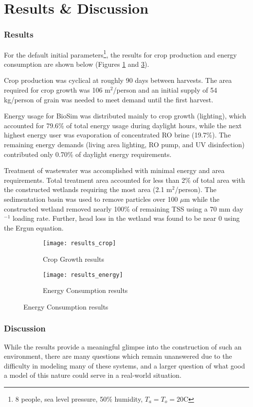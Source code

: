 \part{Results \& Discussion}
\section{Results}
For the default initial parameters\footnote{8 people, sea level pressure, 50\% humidity, $T_a=T_o=20$\degree C}, the results for crop production and energy consumption are shown below (Figures \ref{fig:results_crop} and \ref{fig:results_energy}). 

Crop production was cyclical at roughly 90 days between harvests. The area required for crop growth was 106 m$^2$/person and an initial supply of 54 kg/person of grain was needed to meet demand until the first harvest.

Energy usage for BioSim was distributed mainly to crop growth (lighting), which accounted for 79.6\% of total energy usage during daylight hours, while the next highest energy user was evaporation of concentrated RO brine (19.7\%). The remaining energy demands (living area lighting, RO pump, and UV disinfection) contributed only 0.70\% of daylight energy requirements.

Treatment of wastewater was accomplished with minimal energy and area requirements. Total treatment area accounted for less than 2\% of total area with the constructed wetlands requiring the most area (2.1 m$^2$/person). The sedimentation basin was used to remove particles over 100 $\mu$m while the constructed wetland removed nearly 100\% of remaining TSS using a 70 mm day$^{-1}$ loading rate. Further, head loss in the wetland was found to be near 0 using the Ergun equation.
\begin{figure}[h]
    \centering
    \begin{subfigure}[h]{.47\textwidth}
        \centering
        \texttt{[image: results\_crop]}
        \caption{Crop Growth results}
        \label{fig:results_crop}
    \end{subfigure}
    \hfill
    \begin{subfigure}[h]{.47\textwidth}
        \centering
        \texttt{[image: results\_energy]}
        \caption{Energy Consumption results}
        \label{fig:results_energy}
    \end{subfigure}
\end{figure}

\section{Discussion}
While the results provide a meaningful glimpse into the construction of such an environment, there are many questions which remain unanswered due to the difficulty in modeling many of these systems, and a larger question of what good a model of this nature could serve in a real-world situation. 

